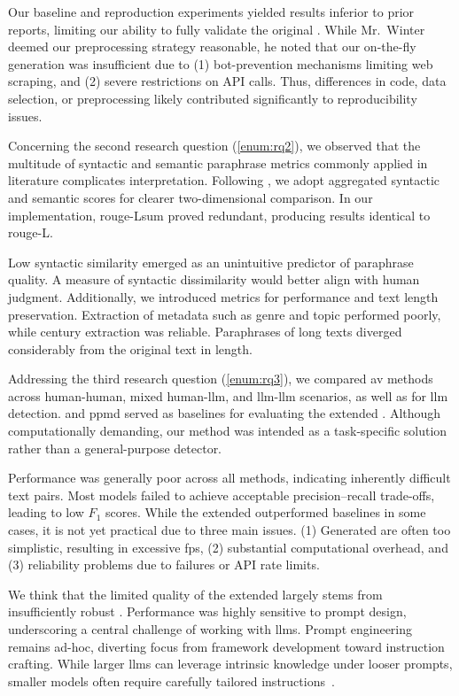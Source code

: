 Our baseline and reproduction experiments yielded results inferior to prior reports, limiting our ability to fully validate the original \impAppr{}. 
While Mr.~Winter deemed our preprocessing strategy reasonable, he noted that our on-the-fly \imp{} generation was insufficient due to (1) bot-prevention mechanisms limiting web scraping, and (2) severe restrictions on API calls. 
Thus, differences in code, data selection, or preprocessing likely contributed significantly to reproducibility issues.

Concerning the second research question (\autoref{enum:rq2}), we observed that the multitude of syntactic and semantic paraphrase metrics commonly applied in literature complicates interpretation. 
Following \citet{gohsen_captions_2023}, we adopt aggregated syntactic and semantic scores for clearer two-dimensional comparison. 
In our implementation, \ac{rouge}-Lsum proved redundant, producing results identical to \ac{rouge}-L.

Low syntactic similarity emerged as an unintuitive predictor of paraphrase quality.
A measure of syntactic dissimilarity would better align with human judgment. 
Additionally, we introduced metrics for \pextractor{} performance and text length preservation. 
Extraction of metadata such as genre and topic performed poorly, while century extraction was reliable. 
Paraphrases of long \dataGutenberg{} texts diverged considerably from the original text in length.

Addressing the third research question (\autoref{enum:rq3}), we compared \ac{av} methods across human-human, mixed human-\ac{llm}, and \ac{llm}-\ac{llm} scenarios, as well as for \ac{llm} detection. 
\unmasking{} and \ac{ppmd} served as baselines for evaluating the extended \impAppr{}. 
Although computationally demanding, our method was intended as a task-specific solution rather than a general-purpose detector. 

Performance was generally poor across all methods, indicating inherently difficult text pairs. 
Most models failed to achieve acceptable precision–recall trade-offs, leading to low $F_1$ scores. 
While the extended \impAppr{} outperformed baselines in some cases, it is not yet practical due to three main issues. 
(1) Generated \imps{} are often too simplistic, resulting in excessive \acp{fp}, (2) substantial computational overhead, and (3) reliability problems due to \pgenerator{} failures or API rate limits.

We think that the limited quality of the extended \impAppr{} largely stems from insufficiently robust \imps{}. 
Performance was highly sensitive to prompt design, underscoring a central challenge of working with \acp{llm}. 
Prompt engineering remains ad-hoc, diverting focus from framework development toward instruction crafting. 
While larger \acp{llm} can leverage intrinsic knowledge under looser prompts, smaller models often require carefully tailored instructions~\citep{schmidt_llm_av_latin_24}. 

